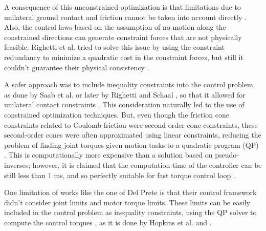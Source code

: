 	A consequence of this unconstrained optimization is that limitations due to unilateral ground contact
	and friction cannot be taken into account directly \cite{Koolen_IJHR2016}.
	Also, the control laws based on the assumption of no motion along the constrained directions can
	generate constraint forces that are not physically feasible.
	Righetti et al.	\cite{Righetti_Humanoids2011} tried to solve this issue by using the constraint
	redundancy to minimize a quadratic cost in the constraint forces, but still it couldn't guarantee
	their physical consistency \cite{DelPrete_PhDThesis2013}.
	
	A safer approach was to include inequality constraints into the control problem, as done by Saab et al.
	\cite{Saab_ICRA2011} \cite{Saab_IROS2011} or later by Righetti and Schaal	\cite{Righetti_Humanoids2012},
	so that it allowed for unilateral contact constraints \cite{DelPrete_PhDThesis2013}.
	This consideration naturally led to the use of constrained optimization	techniques.
	But, even though the friction cone constraints related to Coulomb friction were second-order cone
	constraints, these second-order cones were often approximated using linear constraints, reducing the
	problem of finding joint torques given motion tasks to a quadratic program (QP) \cite{Koolen_IJHR2016}.
	This is computationally more expensive than a solution based on pseudo-inverses; however, it is
	claimed that the computation time of the controller can be still less than 1 ms, and so perfectly
	suitable for fast torque control loop \cite{DelPrete_PhDThesis2013}.
	
	One limitation of works like the one of Del Prete \cite{DelPrete_PhDThesis2013} is that their control
	framework didn't consider joint limits and motor torque limits.
	These limits can be easily included in the control problem as inequality constraints, using the QP
	solver to compute the control torques \cite{DelPrete_PhDThesis2013}, as it is done by Hopkins et al.
	\cite{Hopkins_IJHR2016} and \cite{Koolen_IJHR2016}.